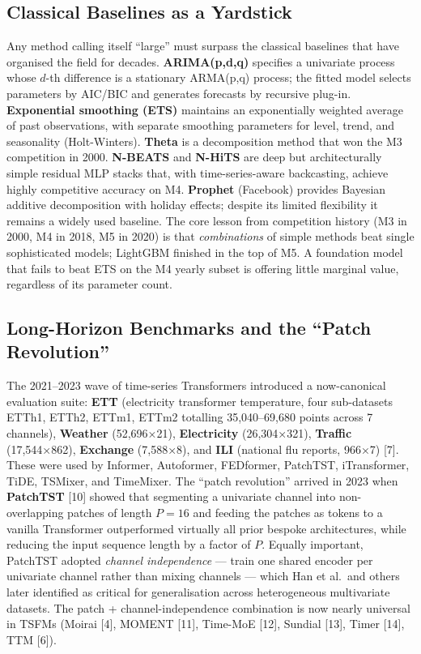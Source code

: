 \documentclass{article}
\begin{document}
\subsection{Classical Baselines as a Yardstick}\label{classical-baselines-as-a-yardstick}

Any method calling itself ``large'' must surpass the classical baselines that have organised the field for decades. \textbf{ARIMA(p,d,q)} specifies a univariate process whose \(d\)-th difference is a stationary ARMA(p,q) process; the fitted model selects parameters by AIC/BIC and generates forecasts by recursive plug-in. \textbf{Exponential smoothing (ETS)} maintains an exponentially weighted average of past observations, with separate smoothing parameters for level, trend, and seasonality (Holt-Winters). \textbf{Theta} is a decomposition method that won the M3 competition in 2000. \textbf{N-BEATS} and \textbf{N-HiTS} are deep but architecturally simple residual MLP stacks that, with time-series-aware backcasting, achieve highly competitive accuracy on M4. \textbf{Prophet} (Facebook) provides Bayesian additive decomposition with holiday effects; despite its limited flexibility it remains a widely used baseline. The core lesson from competition history (M3 in 2000, M4 in 2018, M5 in 2020) is that \emph{combinations} of simple methods beat single sophisticated models; LightGBM finished in the top of M5. A foundation model that fails to beat ETS on the M4 yearly subset is offering little marginal value, regardless of its parameter count.

\subsection{Long-Horizon Benchmarks and the ``Patch Revolution''}\label{long-horizon-benchmarks-and-the-patch-revolution}

The 2021--2023 wave of time-series Transformers introduced a now-canonical evaluation suite: \textbf{ETT} (electricity transformer temperature, four sub-datasets ETTh1, ETTh2, ETTm1, ETTm2 totalling 35,040--69,680 points across 7 channels), \textbf{Weather} (52,696×21), \textbf{Electricity} (26,304×321), \textbf{Traffic} (17,544×862), \textbf{Exchange} (7,588×8), and \textbf{ILI} (national flu reports, 966×7) {[}7{]}. These were used by Informer, Autoformer, FEDformer, PatchTST, iTransformer, TiDE, TSMixer, and TimeMixer. The ``patch revolution'' arrived in 2023 when \textbf{PatchTST} \citep{nie2023atimeseriesisworth} {[}10{]} showed that segmenting a univariate channel into non-overlapping patches of length \(P=16\) and feeding the patches as tokens to a vanilla Transformer outperformed virtually all prior bespoke architectures, while reducing the input sequence length by a factor of \(P\). Equally important, PatchTST adopted \emph{channel independence} --- train one shared encoder per univariate channel rather than mixing channels --- which Han et al.~and others later identified as critical for generalisation across heterogeneous multivariate datasets. The patch + channel-independence combination is now nearly universal in TSFMs (Moirai {[}4{]}, MOMENT {[}11{]}, Time-MoE {[}12{]}, Sundial {[}13{]}, Timer {[}14{]}, TTM {[}6{]}).
\end{document}
